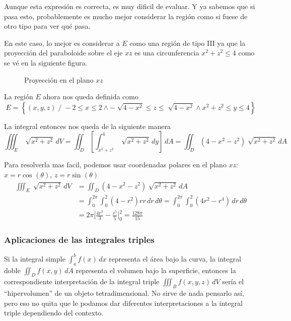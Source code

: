 \documentclass[12pt]{article}
\begin{document}
Aunque esta expresión es correcta, es muy dificil de evaluar. Y ya sabemos que si pasa esto, probablemente es mucho mejor considerar la región como si fuese de otro tipo para ver qué pasa.

En este caso, lo mejor es considerar a $ E $ como una región de tipo III ya que la proyección del paraboloide sobre el eje $ xz $ es una circunferencia $ x^2+z^2\leq 4 $ como se vé en la siguiente figura.

\begin{figure}[H]
  \centering
  {\large }

  \caption{Proyección en el plano $ xz $}
  \label{}
\end{figure}

La región $ E $ ahora nos queda definida como 
\[
	E=\left\{(x,y,z) \;/\; -2\leq x\leq 2 \land -\sqrt[]{4-x^2}\leq z\leq \sqrt[]{4-x^2} \land x^2+z^2\leq y\leq 4\right\}
\]

La integral entonces nos queda de la siguiente manera
\[
  \iiint_{E} \sqrt[]{x^2+z^2} \,dV=\iint_{D} \left[\int_{x^2+z^2}^{4} \sqrt[]{x^2+z^2} \,dy\right] \,dA = \iint_{D} \left(4-x^2-z^2\right)\sqrt[]{x^2+z^2} \,dA
\]

Para resolverla mas facil, podemos usar coordenadas polares en el plano $ xz $: $x=r\cos^{}(\theta) $, $ z=r\sin^{}(\theta) $
\begin{align*}
	\iiint_{E} \sqrt[]{x^2+z^2} \,dV &= \iint_{D} (4-x^2-z^2)\sqrt[]{x^2+z^2} \,dA\\
	 &= \int_{0}^{2\pi} \int_{0}^{2} (4-r^2)rr \,dr\,d\theta=\int_{0}^{2\pi} \int_{0}^{2} (4r^2-r^4) \,dr\,d\theta\\
	  &= 2\pi\Bigg[\frac{4r^3}{3}-\frac{r^5}{5}\Bigg]_{0}^{2}=\frac{128\pi}{15}
\end{align*}

\subsubsection{Aplicaciones de las integrales triples}
Si la integral simple $ \int_{a}^{b} f(x) \,dx $ representa el área bajo la curva, la integral doble $ \iint_{D} f(x,y) \,dA $ representa el volumen bajo la superficie, entonces la correspondiente interpretación de la integral triple $ \iiint_{B} f(x,y,z) \,dV $ sería el ``hipervolumen'' de un objeto tetradimensional. No sirve de nada pensarlo así, pero eso no quita que le podamos dar diferentes interpretaciones a la integral triple dependiendo del contexto.
\end{document}
